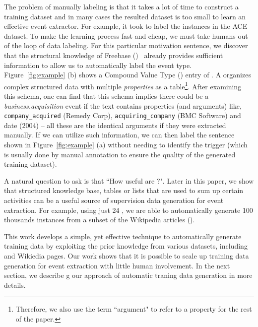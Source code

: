 
The problem of manually labeling is that it takes a lot of time to construct a training dataset and in many cases the resulted dataset is
too small to learn an effective event extractor. For example, it took  to label the  instances in the ACE
dataset. To make the learning process fast and cheap, we must take humans out of the loop of data labeling.  For this particular motivation
sentence, we discover that the structural knowledge of Freebase (\FB)~\cite{bollacker2008freebase} already provides sufficient information
to allow us to automatically label the event type. Figure~\ref{fig:example} (b) shows a Compound Value Type (\CVT) entry of \FB. A \CVT
organizes complex structured data with multiple \emph{properties} as a table\footnote{Therefore, we also use the term ``argument" to refer
to a \CVT property for the rest of the paper.}. After examining this \CVT schema, one can find that this schema implies there could be a
\emph{business.acquisition} event if the text contains properties (and arguments) like, \texttt{company\_acquired} (Remedy Corp),
\texttt{acquiring\_company} (BMC Software) and date (2004) -- all these are the identical arguments if they were extracted manually. If we
can utilize such \CVT information, we can then label the sentence shown in Figure~\ref{fig:example} (a) without needing to identify the
trigger (which is usually done by manual annotation to ensure the quality of the generated training dataset).


A natural question to ask is that ``How useful are \CVTs?". Later in this paper, we show that structured knowledge base, tables or lists
that are used to sum up certain activities can be a useful source of supervision data generation for event extraction. For example, using
just 24 \CVTs, we are able to automatically generate 100 thousands instances from a subset of the Wikipedia articles
().


This work develops a simple, yet effective technique to automatically generate training data by exploiting the prior \CVT knowledge from
various datasets, including \FB and Wikiedia pages. Our work shows that it is possible to scale up training data generation for event
extraction with little human involvement. In the next section, we describe g our approach of automatic traning data generation in more
details.



